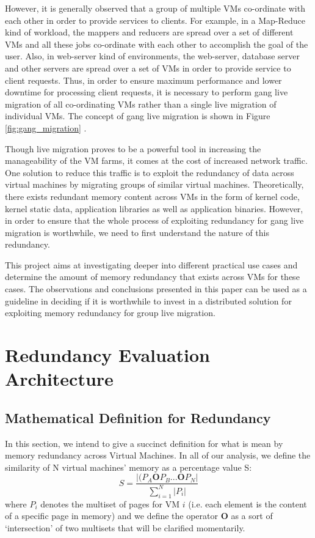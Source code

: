 \documentclass{acm_proc_article-sp}
\begin{document}
However, it is generally observed that a group of multiple VMs co-ordinate with each other in order to provide services to clients. For example, in a Map-Reduce kind of workload, the mappers and reducers are spread over a set of different VMs and all these jobs co-ordinate with each other to accomplish the goal of the user. Also, in web-server kind of environments, the web-server, database server and other servers are spread over a set of VMs in order to provide service to client requests. Thus, in order to ensure maximum performance and lower downtime for processing client requests, it is necessary to perform gang live migration of all co-ordinating VMs rather than a single live migration of individual VMs. The concept of gang live migration is shown in Figure \ref{fig:gang_migration} \cite{live_gang}.
\par
Though live migration proves to be a powerful tool in increasing the manageability of the VM farms, it comes at the cost of increased network traffic. One solution to reduce this traffic is to exploit the redundancy of data across virtual machines by migrating groups of similar virtual machines. Theoretically, there exists redundant memory content across VMs in the form of kernel code, kernel static data, application libraries as well as application binaries. However, in order to ensure that the whole process of exploiting redundancy for gang live migration is worthwhile, we need to first understand the nature of this redundancy.
\par
This project aims at investigating deeper into different practical use cases and determine the amount of memory redundancy that exists across VMs for these cases. The observations and conclusions presented in this paper can be used as a guideline in deciding if it is worthwhile to invest in a distributed solution for exploiting memory redundancy for group live migration.
\par

\section{Redundancy Evaluation Architecture}\label{sec:redundancy}

\subsection{Mathematical Definition for Redundancy}\label{sec:red_math}
In this section, we intend to give a succinct definition for what is mean by memory redundancy across Virtual Machines.  In all of our analysis, we define the similarity of N virtual machines' memory as a percentage value S:
\begin{equation}
S = \frac{|(P_A \mathbf{O} P_B ... \mathbf{O} P_N|}{\sum\limits_{i=1}^{N}|P_i|}
\end{equation}\label{eqn:s}
where $P_i$ denotes the multiset of pages for VM $i$ (i.e. each element is the content of a specific page in memory) and we define the operator $\mathbf{O}$ as a sort of `intersection' of two multisets that will be clarified momentarily.  
\end{document}
